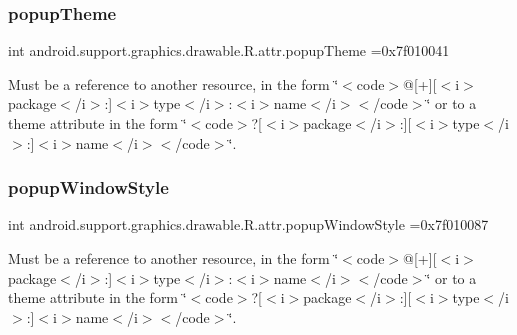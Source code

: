 \subsubsection{\texorpdfstring{popup\+Theme}{popupTheme}}
{\footnotesize\ttfamily int android.\+support.\+graphics.\+drawable.\+R.\+attr.\+popup\+Theme =0x7f010041\hspace{0.3cm}{\ttfamily [static]}}

Must be a reference to another resource, in the form \char`\"{}$<$code$>$@\mbox{[}+\mbox{]}\mbox{[}$<$i$>$package$<$/i$>$\+:\mbox{]}$<$i$>$type$<$/i$>$\+:$<$i$>$name$<$/i$>$$<$/code$>$\char`\"{} or to a theme attribute in the form \char`\"{}$<$code$>$?\mbox{[}$<$i$>$package$<$/i$>$\+:\mbox{]}\mbox{[}$<$i$>$type$<$/i$>$\+:\mbox{]}$<$i$>$name$<$/i$>$$<$/code$>$\char`\"{}. \mbox{\label{classandroid_1_1support_1_1graphics_1_1drawable_1_1R_1_1attr_a1790c5d5f95b0324db778d72a7c6370a}} 
\subsubsection{\texorpdfstring{popup\+Window\+Style}{popupWindowStyle}}
{\footnotesize\ttfamily int android.\+support.\+graphics.\+drawable.\+R.\+attr.\+popup\+Window\+Style =0x7f010087\hspace{0.3cm}{\ttfamily [static]}}

Must be a reference to another resource, in the form \char`\"{}$<$code$>$@\mbox{[}+\mbox{]}\mbox{[}$<$i$>$package$<$/i$>$\+:\mbox{]}$<$i$>$type$<$/i$>$\+:$<$i$>$name$<$/i$>$$<$/code$>$\char`\"{} or to a theme attribute in the form \char`\"{}$<$code$>$?\mbox{[}$<$i$>$package$<$/i$>$\+:\mbox{]}\mbox{[}$<$i$>$type$<$/i$>$\+:\mbox{]}$<$i$>$name$<$/i$>$$<$/code$>$\char`\"{}. \mbox{\label{classandroid_1_1support_1_1graphics_1_1drawable_1_1R_1_1attr_a04a7405753c664f645bbb521586b88cc}} 

